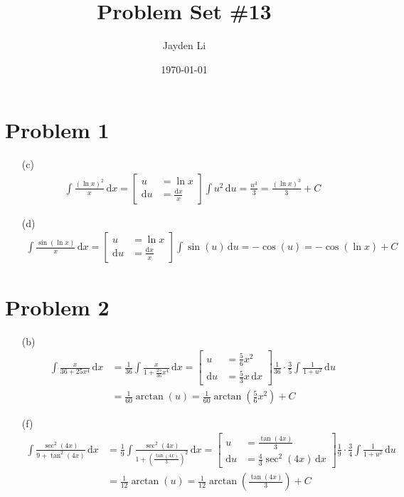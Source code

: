 \documentclass[preview, margin=0.6in]{standalone}
\title{\vspace*{-30pt}Problem Set \#13}
\author{Jayden Li}
\date{\today}
\newcommand*{\problem}[1]{\section*{Problem #1}}
\begin{document}
\fontsize{12pt}{12pt}\selectfont
\setlength{\abovedisplayskip}{0pt}
\maketitle
\problem{1}
\begin{itemize}
	\item[(c)]
	\begin{align*}
		\int \frac{(\ln x)^2}{x}\,\mathrm{d}x
		=\left[\begin{aligned}
			u&=\ln x \\
			\mathrm du&=\frac{\mathrm dx}{x}
		\end{aligned}\right]
		\int u^2\,\mathrm{d}u
		=\frac{u^3}{3}
		=\boxed{\frac{\left(\ln x\right)^3}{3}+C}
	\end{align*}

	\item[(d)]
	\begin{align*}
	    \int \frac{\sin\left(\ln x\right)}{x}\,\mathrm{d}x
		=\left[\begin{aligned}
			u&=\ln x \\ 
			\mathrm du&=\frac{\mathrm dx}{x}
		\end{aligned}\right]
		\int \sin\left(u\right)\,\mathrm{d}u
		=-\cos\left(u\right)
		=\boxed{-\cos\left(\ln x\right)+C}
	\end{align*}
\end{itemize}

\problem{2}
\begin{itemize}
	\item[(b)]
	\begin{align*}
		\int \frac{x}{36+25x^4}\,\mathrm{d}x
		&=\frac{1}{36}\int \frac{x}{1+\frac{25}{36}x^4}\,\mathrm{d}x
		=\left[\begin{aligned}
			u&=\frac{5}{6}x^2 \\ 
			\mathrm{d}u&=\frac{5}{3}x\,\mathrm{d}x
		\end{aligned}\right]
		\frac{1}{36}\cdot \frac{3}{5}\int \frac{1}{1+u^2}\,\mathrm{d}u \\
		&=\frac{1}{60}\arctan\left(u\right)
		=\boxed{\frac{1}{60}\arctan\left(\frac{5}{6}x^2\right)+C}
	\end{align*}

	\item[(f)]
	\begin{align*}
	    \int \frac{\sec^2\left(4x\right)}{9+\tan^2\left(4x\right)}\,\mathrm{d}x
		&=\frac19\int \frac{\sec^2\left(4x\right)}{1+\left(\frac{\tan\left(4x\right)}{3}\right)^2}\,\mathrm{d}x
		=\left[\begin{aligned}
			u&=\frac{\tan\left(4x\right)}{3} \\
			\mathrm{d}u&=\frac43\sec^2\left(4x\right)\,\mathrm{d}x
		\end{aligned}\right]
		\frac{1}{9}\cdot\frac{3}{4}\int \frac{1}{1+u^2}\,\mathrm{d}u \\
		&=\frac{1}{12}\arctan\left(u\right)
		=\boxed{\frac{1}{12}\arctan\left(\frac{\tan(4x)}{3}\right)+C}
	\end{align*}
\end{itemize}
\end{document}
